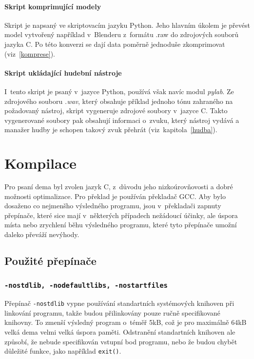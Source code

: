 \subsubsection{Skript komprimující modely} \label{scriptRaw2c}
Skript je napsaný ve skriptovacím jazyku Python.
Jeho hlavním úkolem je převést model vytvořený například v~Blenderu z~formátu .raw do zdrojových souborů jazyka C.
Po této konverzi se dají data poměrně jednoduše zkomprimovat (viz~\ref{komprese}).
\subsubsection{Skript ukládající hudební nástroje} \label{scriptInstruments}
I~tento skript je psaný v~jazyce Python, používá však navíc modul \emph{pylab}.
Ze zdrojového souboru \emph{.wav}, který obsahuje příklad jednoho tónu zahraného na požadovaný nástroj, skript vygeneruje zdrojové soubory v~jazyce C.
Takto vygenerované soubory pak obsahují informaci o~zvuku, který nástroj vydává a manažer hudby je schopen takový zvuk přehrát (viz~kapitola~\ref{hudba}).
 

\chapter{Kompilace}
Pro psaní dema byl zvolen jazyk C, z~důvodu jeho nizkoúrovňovosti a dobré možnosti optimalizace.
Pro překlad je používán překladač GCC.
Aby bylo dosaženo co nejmenšho výsledného programu, jsou v~překladači zapnuty přepínače, které sice mají v~některých případech nežádoucí účinky, ale úspora místa nebo zrychlení běhu výsledného programu, které tyto přepínače umožní daleko převáží nevýhody.
\section{Použité přepínače} \label{prepinace }
\subsection{\texttt{-nostdlib, -nodefaultlibs, -nostartfiles}}
Přepínač \texttt{-nostdlib} vypne používání standartních systémových knihoven při linkování programu, takže budou přilinkovány pouze ručně specifikované knihovny.
To zmenší výsledný program o~téměř 5kB, což je pro maximálně 64kB velká dema velmi velká úspora paměti.
Odstranění standartních knihoven ale způsobí, že nebude specifikován vstupní bod programu, nebo že budou chybět důležité funkce, jako například \texttt{exit()}.

